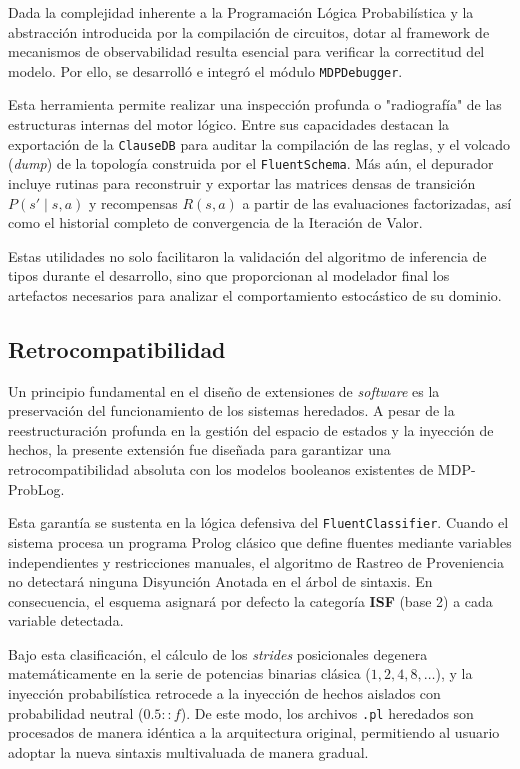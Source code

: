 Dada la complejidad inherente a la Programación Lógica Probabilística y la abstracción introducida por la compilación de circuitos, dotar al framework de mecanismos de observabilidad resulta esencial para verificar la correctitud del modelo. Por ello, se desarrolló e integró el módulo \texttt{MDPDebugger}.

Esta herramienta permite realizar una inspección profunda o "radiografía" de las estructuras internas del motor lógico. Entre sus capacidades destacan la exportación de la \texttt{ClauseDB} para auditar la compilación de las reglas, y el volcado (\textit{dump}) de la topología construida por el \texttt{FluentSchema}. Más aún, el depurador incluye rutinas para reconstruir y exportar las matrices densas de transición $P(s' \mid s, a)$ y recompensas $R(s, a)$ a partir de las evaluaciones factorizadas, así como el historial completo de convergencia de la Iteración de Valor. 

Estas utilidades no solo facilitaron la validación del algoritmo de inferencia de tipos durante el desarrollo, sino que proporcionan al modelador final los artefactos necesarios para analizar el comportamiento estocástico de su dominio.

\subsection{Retrocompatibilidad}
\label{sec:di-retrocompatibilidad}

Un principio fundamental en el diseño de extensiones de \textit{software} es la preservación del funcionamiento de los sistemas heredados. A pesar de la reestructuración profunda en la gestión del espacio de estados y la inyección de hechos, la presente extensión fue diseñada para garantizar una retrocompatibilidad absoluta con los modelos booleanos existentes de MDP-ProbLog.

Esta garantía se sustenta en la lógica defensiva del \texttt{FluentClassifier}. Cuando el sistema procesa un programa Prolog clásico que define fluentes mediante variables independientes y restricciones manuales, el algoritmo de Rastreo de Proveniencia no detectará ninguna Disyunción Anotada en el árbol de sintaxis. En consecuencia, el esquema asignará por defecto la categoría \textbf{ISF} (base 2) a cada variable detectada. 

Bajo esta clasificación, el cálculo de los \textit{strides} posicionales degenera matemáticamente en la serie de potencias binarias clásica ($1, 2, 4, 8, \dots$), y la inyección probabilística retrocede a la inyección de hechos aislados con probabilidad neutral ($0.5::f$). De este modo, los archivos \texttt{.pl} heredados son procesados de manera idéntica a la arquitectura original, permitiendo al usuario adoptar la nueva sintaxis multivaluada de manera gradual.

